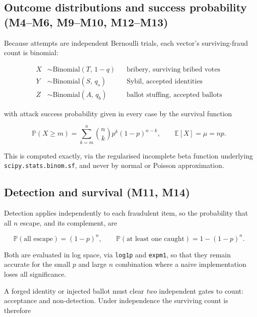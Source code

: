 \documentclass[11pt,a4paper]{article}
\newcommand{\Prob}{\mathbb{P}}
\newcommand{\Ex}{\mathbb{E}}
\newcommand{\Bin}{\mathrm{Binomial}}
\newcommand{\code}[1]{\texttt{\small #1}}
\begin{document}
\subsection{Outcome distributions and success probability (M4--M6, M9--M10, M12--M13)}

Because attempts are independent Bernoulli trials, each vector's surviving-fraud count
is binomial:

\begin{align}
X &\sim \Bin(T,\, 1 - q)          &&\text{bribery, surviving bribed votes} \label{eq:m4}\\
Y &\sim \Bin(S,\, q_s)             &&\text{Sybil, accepted identities} \label{eq:m9}\\
Z &\sim \Bin(A,\, q_b)             &&\text{ballot stuffing, accepted ballots} \label{eq:m12}
\end{align}

with attack success probability given in every case by the survival function

\begin{equation}
\Prob(X \geq m) = \sum_{k=m}^{n} \binom{n}{k} p^{k} (1-p)^{n-k},
\qquad \Ex[X] = \mu = np .
\label{eq:m5}
\end{equation}

This is computed exactly, via the regularised incomplete beta function underlying
\code{scipy.stats.binom.sf}, and never by normal or Poisson approximation.

\subsection{Detection and survival (M11, M14)}

Detection applies independently to each fraudulent item, so the probability that all $n$
escape, and its complement, are

\begin{equation}
\Prob(\text{all escape}) = (1 - p)^{n}, \qquad
\Prob(\text{at least one caught}) = 1 - (1 - p)^{n} .
\label{eq:m11}
\end{equation}

Both are evaluated in log space, via \code{log1p} and \code{expm1}, so that they remain
accurate for the small $p$ and large $n$ combination where a naive implementation loses
all significance.

A forged identity or injected ballot must clear \emph{two} independent gates to count:
acceptance and non-detection. Under independence the surviving count is therefore
\end{document}
